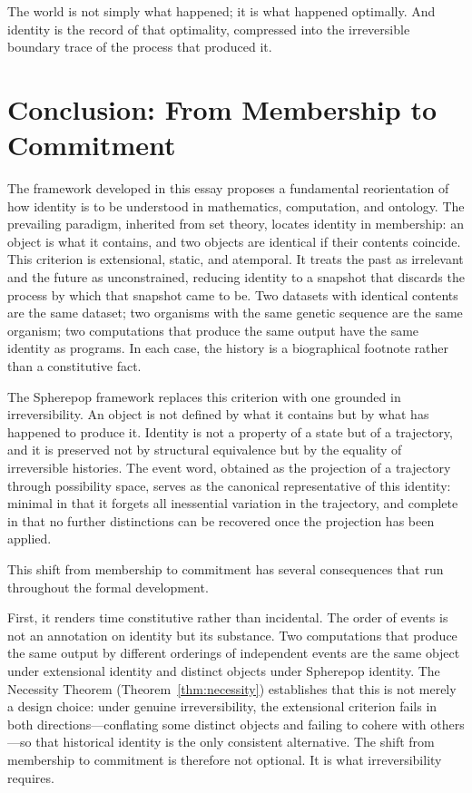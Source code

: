 \documentclass[12pt]{article}
\theoremstyle{plain}
\theoremstyle{definition}
\theoremstyle{remark}
\begin{document}
The world is not simply what happened; it is what happened optimally.  And
identity is the record of that optimality, compressed into the irreversible
boundary trace of the process that produced it.
\section{Conclusion: From Membership to Commitment}
\label{sec:conclusion}

The framework developed in this essay proposes a fundamental reorientation of
how identity is to be understood in mathematics, computation, and ontology.  The
prevailing paradigm, inherited from set theory, locates identity in membership:
an object is what it contains, and two objects are identical if their contents
coincide.  This criterion is extensional, static, and atemporal.  It treats the
past as irrelevant and the future as unconstrained, reducing identity to a
snapshot that discards the process by which that snapshot came to be.  Two
datasets with identical contents are the same dataset; two organisms with the
same genetic sequence are the same organism; two computations that produce the
same output have the same identity as programs.  In each case, the history is
a biographical footnote rather than a constitutive fact.

The Spherepop framework replaces this criterion with one grounded in
irreversibility.  An object is not defined by what it contains but by what has
happened to produce it.  Identity is not a property of a state but of a
trajectory, and it is preserved not by structural equivalence but by the
equality of irreversible histories.  The event word, obtained as the projection
of a trajectory through possibility space, serves as the canonical
representative of this identity: minimal in that it forgets all inessential
variation in the trajectory, and complete in that no further distinctions can
be recovered once the projection has been applied.

This shift from membership to commitment has several consequences that run
throughout the formal development.

First, it renders time constitutive rather than incidental.  The order of events
is not an annotation on identity but its substance.  Two computations that
produce the same output by different orderings of independent events are the
same object under extensional identity and distinct objects under Spherepop
identity.  The Necessity Theorem (Theorem~\ref{thm:necessity}) establishes that
this is not merely a design choice: under genuine irreversibility, the
extensional criterion fails in both directions---conflating some distinct objects
and failing to cohere with others---so that historical identity is the only
consistent alternative.  The shift from membership to commitment is therefore
not optional.  It is what irreversibility requires.
\end{document}
